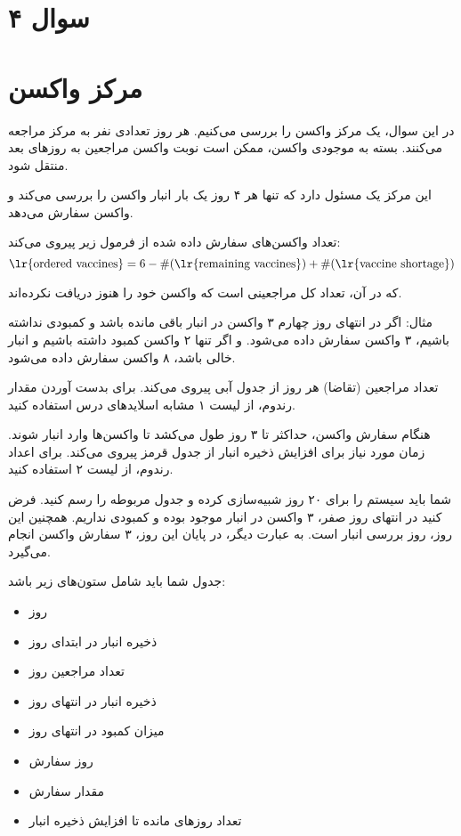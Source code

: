 \section*{سوال ۴}

\section*{مرکز واکسن}

در این سوال، یک مرکز واکسن را بررسی می‌کنیم. هر روز تعدادی نفر به مرکز مراجعه می‌کنند. بسته به موجودی واکسن، ممکن است نوبت واکسن مراجعین به روزهای بعد منتقل شود.

این مرکز یک مسئول دارد که تنها هر ۴ روز یک بار انبار واکسن را بررسی می‌کند و واکسن سفارش می‌دهد.

تعداد واکسن‌های سفارش داده شده از فرمول زیر پیروی می‌کند:
\[ \text{\lr{ordered vaccines}} = 6 - \#(\text{\lr{remaining vaccines}}) + \#(\text{\lr{vaccine shortage}}) \]

که در آن، 
تعداد کل مراجعینی است که واکسن خود را هنوز دریافت نکرده‌اند.

مثال: اگر در انتهای روز چهارم ۳ واکسن در انبار باقی مانده باشد و کمبودی نداشته باشیم، ۳ واکسن سفارش داده می‌شود. و اگر تنها ۲ واکسن کمبود داشته باشیم و انبار خالی باشد، ۸ واکسن سفارش داده می‌شود.


تعداد مراجعین (تقاضا) هر روز از جدول آبی پیروی می‌کند. برای بدست آوردن مقدار رندوم، از لیست ۱ مشابه اسلایدهای درس استفاده کنید.

هنگام سفارش واکسن، حداکثر تا ۳ روز طول می‌کشد تا واکسن‌ها وارد انبار شوند. زمان مورد نیاز برای افزایش ذخیره انبار از جدول قرمز پیروی می‌کند. برای اعداد رندوم، از لیست ۲ استفاده کنید.

شما باید سیستم را برای ۲۰ روز شبیه‌سازی کرده و جدول مربوطه را رسم کنید. فرض کنید در انتهای روز صفر، ۳ واکسن در انبار موجود بوده و کمبودی نداریم. همچنین این روز، روز بررسی انبار است. به عبارت دیگر، در پایان این روز، ۳ سفارش واکسن انجام می‌گیرد.

جدول شما باید شامل ستون‌های زیر باشد:

\begin{itemize}
	\item روز
	\item ذخیره انبار در ابتدای روز
	\item تعداد مراجعین روز
	\item ذخیره انبار در انتهای روز
	\item میزان کمبود در انتهای روز
	\item روز سفارش
	\item مقدار سفارش
	\item تعداد روزهای مانده تا افزایش ذخیره انبار
\end{itemize}

